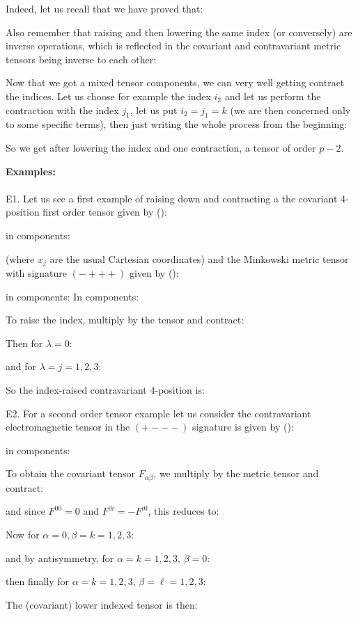 	Indeed, let us recall that we have proved that:
	
	Also remember that raising and then lowering the same index (or conversely) are inverse operations, which is reflected in the covariant and contravariant metric tensors being inverse to each other:
	
	Now that we got a mixed tensor components, we can very well getting contract the indices. Let us choose for example the index $i_2$ and let us perform the contraction with the index $j_1$, let us put $i_2=j_1=k$ (we are then concerned only to some specific terms), then just writing the whole process from the beginning:
	
	So we get after lowering the index and one contraction, a tensor of order $p-2$.
	\begin{tcolorbox}[colframe=black,colback=white,sharp corners]
	\textbf{{\Large {}}Examples:}\\\\
	E1. Let us see a first example of raising down and contracting a the covariant 4-position first order tensor given by ():
	
	in components:
	
	(where $x_j$ are the usual Cartesian coordinates) and the Minkowski metric tensor with signature $(-+++)$ given by ():
	
	in components:
	In components:
	
	To raise the index, multiply by the tensor and contract:
	
	Then for $\lambda = 0$:
	
	and for $\lambda = j = 1, 2, 3$:
	
	So the index-raised contravariant $4$-position is:
	
	\end{tcolorbox}
	
	\begin{tcolorbox}[colframe=black,colback=white,sharp corners]
	E2. For a second order tensor example let us consider the contravariant electromagnetic tensor in the $(+---)$ signature is given by ():
	
	in components:
	
	To obtain the covariant tensor $F_{\alpha\beta}$, we multiply by the metric tensor and contract:
	
	and since $F^{00} = 0$ and $F^{0i}=-F^{i0}$, this reduces to:
	
	Now for $\alpha = 0, \beta = k = 1, 2, 3$:
	
	and by antisymmetry, for $\alpha = k = 1, 2, 3$, $\beta = 0$:
	
	then finally for $\alpha = k = 1, 2, 3$, $\beta = \ell = 1, 2, 3$:
	
	The (covariant) lower indexed tensor is then:
	
	\end{tcolorbox}
	

